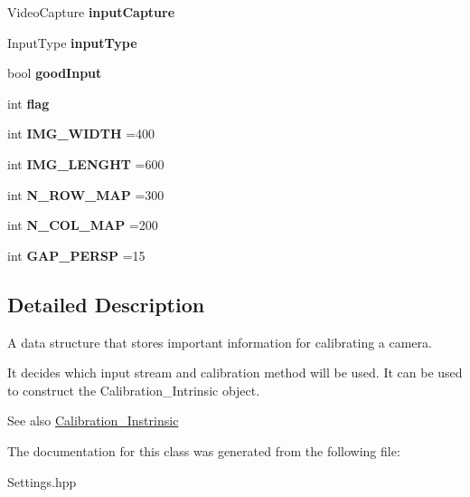 \begin{DoxyCompactItemize}
Video\+Capture {\bfseries input\+Capture}
\item 
\mbox{\label{class_settings_a89fb14ce9856fb642f18bb0f7c5b8868}} 
Input\+Type {\bfseries input\+Type}
\item 
\mbox{\label{class_settings_a3b9fc27b555f982bd5b9ea5198e1f7e3}} 
bool {\bfseries good\+Input}
\item 
\mbox{\label{class_settings_aba5691e3e76525f93ea254e654ec3717}} 
int {\bfseries flag}
\item 
\mbox{\label{class_settings_a5e8532b46bca347b6fc0336480914544}} 
int {\bfseries I\+M\+G\+\_\+\+W\+I\+D\+TH} =400
\item 
\mbox{\label{class_settings_ab0fe607b4c843f4fff0b1b651fd6bf02}} 
int {\bfseries I\+M\+G\+\_\+\+L\+E\+N\+G\+HT} =600
\item 
\mbox{\label{class_settings_a8cc44bebe159b733449a2b52f99cc264}} 
int {\bfseries N\+\_\+\+R\+O\+W\+\_\+\+M\+AP} =300
\item 
\mbox{\label{class_settings_a1768a2eeed3a80ccf1a9a645b8e9e946}} 
int {\bfseries N\+\_\+\+C\+O\+L\+\_\+\+M\+AP} =200
\item 
\mbox{\label{class_settings_a08b59baafe94e711e02075edc9febfa6}} 
int {\bfseries G\+A\+P\+\_\+\+P\+E\+R\+SP} =15
\end{DoxyCompactItemize}


\subsection{Detailed Description}
A data structure that stores important information for calibrating a camera. 

It decides which input stream and calibration method will be used. It can be used to construct the Calibration\+\_\+\+Intrinsic object. \begin{DoxySeeAlso}{See also}
\mbox{\hyperlink{class_calibration___instrinsic}{Calibration\+\_\+\+Instrinsic}} 
\end{DoxySeeAlso}


The documentation for this class was generated from the following file\+:\begin{DoxyCompactItemize}
\item 
Settings.\+hpp\end{DoxyCompactItemize}
